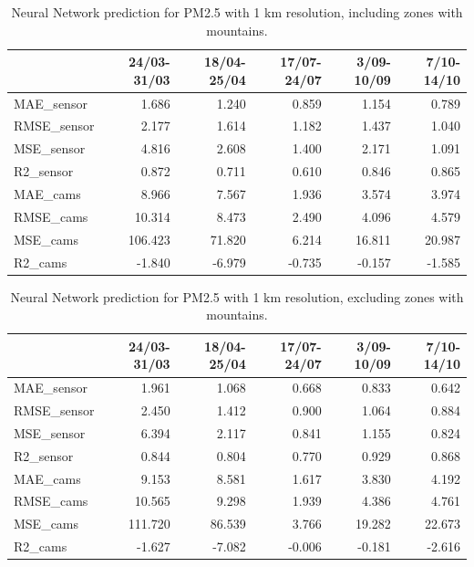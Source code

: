 \begin{table}[H]
\begin{tabular}{lrrrrr}
\toprule
 &  24/03-31/03 &  18/04-25/04 &  17/07-24/07 &  3/09-10/09 &  7/10-14/10 \\
\midrule
 MAE\_sensor &        1.686 &        1.240 &        0.859 &       1.154 &       0.789 \\
RMSE\_sensor &        2.177 &        1.614 &        1.182 &       1.437 &       1.040 \\
 MSE\_sensor &        4.816 &        2.608 &        1.400 &       2.171 &       1.091 \\
  R2\_sensor &        0.872 &        0.711 &        0.610 &       0.846 &       0.865 \\
   MAE\_cams &        8.966 &        7.567 &        1.936 &       3.574 &       3.974 \\
  RMSE\_cams &       10.314 &        8.473 &        2.490 &       4.096 &       4.579 \\
   MSE\_cams &      106.423 &       71.820 &        6.214 &      16.811 &      20.987 \\
    R2\_cams &       -1.840 &       -6.979 &       -0.735 &      -0.157 &      -1.585 \\
\bottomrule
\end{tabular}
\caption{Neural Network prediction for PM2.5 with 1 km resolution, including zones with mountains.}
\end{table}
\begin{table}[H]
\begin{tabular}{lrrrrr}
\toprule
 &  24/03-31/03 &  18/04-25/04 &  17/07-24/07 &  3/09-10/09 &  7/10-14/10 \\
\midrule
 MAE\_sensor &        1.961 &        1.068 &        0.668 &       0.833 &       0.642 \\
RMSE\_sensor &        2.450 &        1.412 &        0.900 &       1.064 &       0.884 \\
 MSE\_sensor &        6.394 &        2.117 &        0.841 &       1.155 &       0.824 \\
  R2\_sensor &        0.844 &        0.804 &        0.770 &       0.929 &       0.868 \\
   MAE\_cams &        9.153 &        8.581 &        1.617 &       3.830 &       4.192 \\
  RMSE\_cams &       10.565 &        9.298 &        1.939 &       4.386 &       4.761 \\
   MSE\_cams &      111.720 &       86.539 &        3.766 &      19.282 &      22.673 \\
    R2\_cams &       -1.627 &       -7.082 &       -0.006 &      -0.181 &      -2.616 \\
\bottomrule
\end{tabular}
\caption{Neural Network prediction for PM2.5 with 1 km resolution, excluding zones with mountains.}
\end{table}
